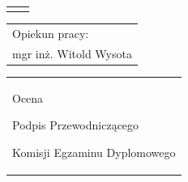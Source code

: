\begin{titlepage}
{\begin{center}
	\vspace*{2\baselineskip}{\LARGE Praca dyplomowa inżynierska\par}
	\vspace{3\baselineskip}{\LARGE\strut Łukasz Rafał Szewczyk\par}
	\vspace*{2\baselineskip}{\huge\bfseries Projekt i~implementacja biblioteki dla Qt i~Qt~Quick do operowania na wykresach typu biurowego\par}

	\vspace*{7\baselineskip}
	\hfill\mbox{}\par\vspace*{\baselineskip}\noindent
	\begin{tabular}[b]{@{}p{3cm}@{\ }l@{}}
	    {\large\hfill } & {\large }
	\end{tabular}
	\hfill
	\begin{tabular}[b]{@{}l@{}}
	Opiekun pracy: \\[\smallskipamount]
	{\large mgr inż. Witold Wysota}
	\end{tabular}\par
	\vspace*{4\baselineskip}
    \begin{tabular}{p{\textwidth}}
    \begin{flushleft}
	\begin{minipage}{7cm}
	Ocena \dotfill
	\par\vspace{1.6\baselineskip}
	\dotfill
	\par\noindent
	\centerline{\footnotesize Podpis Przewodniczącego} \par
	\centerline{\footnotesize Komisji Egzaminu Dyplomowego}\par
	\end{minipage}
    \end{flushleft}
    \end{tabular}
    \end{center}}


\end{titlepage}
